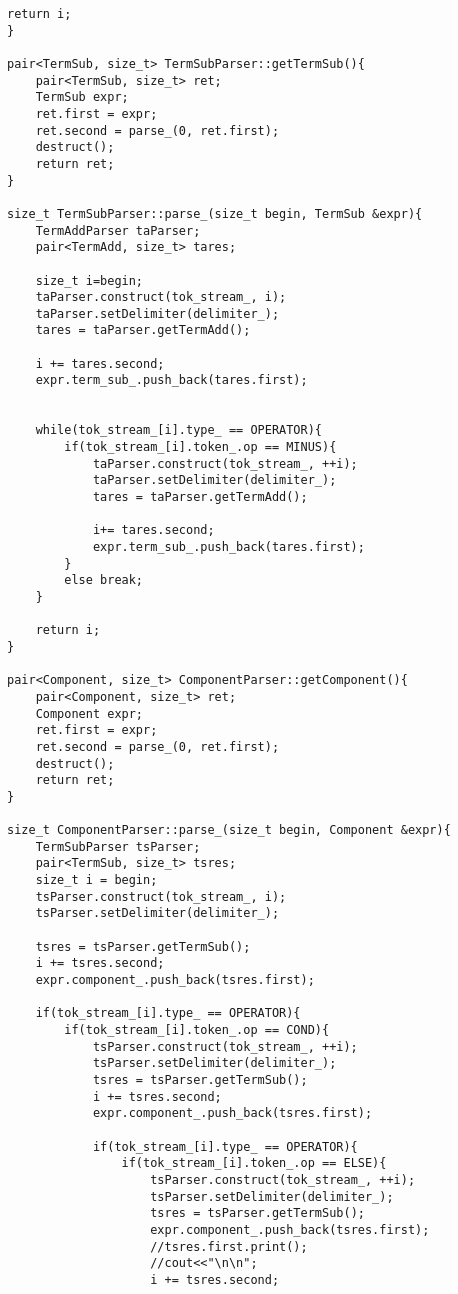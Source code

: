 \documentclass[pdftex,12pt,letterpaper,notitlepage,twoside]{article}
\begin{document}
\begin{lstlisting}[frame=single,caption={C program for testing}]
    return i;
}

pair<TermSub, size_t> TermSubParser::getTermSub(){
    pair<TermSub, size_t> ret;
    TermSub expr;
    ret.first = expr;
    ret.second = parse_(0, ret.first);
    destruct();
    return ret;
}

size_t TermSubParser::parse_(size_t begin, TermSub &expr){
    TermAddParser taParser;
    pair<TermAdd, size_t> tares;

    size_t i=begin;
    taParser.construct(tok_stream_, i);
    taParser.setDelimiter(delimiter_);
    tares = taParser.getTermAdd();

    i += tares.second;
    expr.term_sub_.push_back(tares.first);
    

    while(tok_stream_[i].type_ == OPERATOR){
        if(tok_stream_[i].token_.op == MINUS){
            taParser.construct(tok_stream_, ++i);
            taParser.setDelimiter(delimiter_);
            tares = taParser.getTermAdd();
            
            i+= tares.second;
            expr.term_sub_.push_back(tares.first);
        }
        else break;
    }

    return i;
}

pair<Component, size_t> ComponentParser::getComponent(){
    pair<Component, size_t> ret;
    Component expr;
    ret.first = expr;
    ret.second = parse_(0, ret.first);
    destruct();
    return ret;
}

size_t ComponentParser::parse_(size_t begin, Component &expr){
    TermSubParser tsParser;
    pair<TermSub, size_t> tsres;
    size_t i = begin;
    tsParser.construct(tok_stream_, i);
    tsParser.setDelimiter(delimiter_);

    tsres = tsParser.getTermSub();
    i += tsres.second;
    expr.component_.push_back(tsres.first);

    if(tok_stream_[i].type_ == OPERATOR){
        if(tok_stream_[i].token_.op == COND){
            tsParser.construct(tok_stream_, ++i);
            tsParser.setDelimiter(delimiter_);
            tsres = tsParser.getTermSub();
            i += tsres.second;
            expr.component_.push_back(tsres.first);

            if(tok_stream_[i].type_ == OPERATOR){
                if(tok_stream_[i].token_.op == ELSE){
                    tsParser.construct(tok_stream_, ++i);
                    tsParser.setDelimiter(delimiter_);
                    tsres = tsParser.getTermSub();
                    expr.component_.push_back(tsres.first);
                    //tsres.first.print();
                    //cout<<"\n\n";
                    i += tsres.second;


\end{lstlisting}
\end{document}
